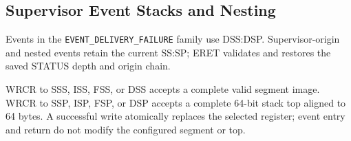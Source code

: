 \subsection{Supervisor Event Stacks and Nesting}


Events in the \texttt{EVENT\_DELIVERY\_FAILURE} family use DSS:DSP. Supervisor-origin and nested events retain the current SS:SP;
ERET validates and restores the saved STATUS depth and origin chain.

WRCR to SSS, ISS, FSS, or DSS accepts a complete valid segment image. WRCR to SSP, ISP, FSP, or DSP accepts a complete
64-bit stack top aligned to 64 bytes. A successful write atomically replaces the selected register; event entry and return do not
modify the configured segment or top.
